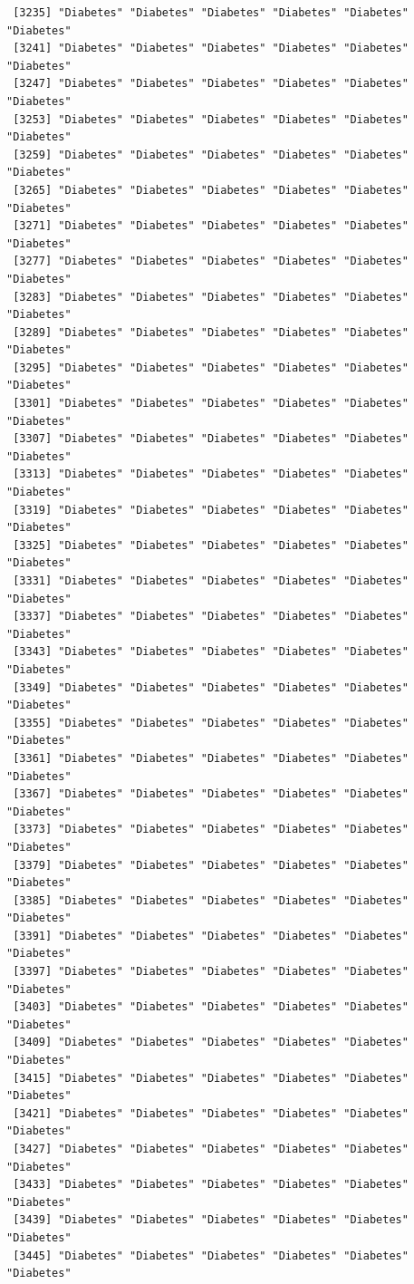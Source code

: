 \documentclass[
  letterpaper,
  DIV=11,
  numbers=noendperiod]{scrartcl}
\begin{document}
\begin{verbatim}
 [3235] "Diabetes" "Diabetes" "Diabetes" "Diabetes" "Diabetes" "Diabetes"
 [3241] "Diabetes" "Diabetes" "Diabetes" "Diabetes" "Diabetes" "Diabetes"
 [3247] "Diabetes" "Diabetes" "Diabetes" "Diabetes" "Diabetes" "Diabetes"
 [3253] "Diabetes" "Diabetes" "Diabetes" "Diabetes" "Diabetes" "Diabetes"
 [3259] "Diabetes" "Diabetes" "Diabetes" "Diabetes" "Diabetes" "Diabetes"
 [3265] "Diabetes" "Diabetes" "Diabetes" "Diabetes" "Diabetes" "Diabetes"
 [3271] "Diabetes" "Diabetes" "Diabetes" "Diabetes" "Diabetes" "Diabetes"
 [3277] "Diabetes" "Diabetes" "Diabetes" "Diabetes" "Diabetes" "Diabetes"
 [3283] "Diabetes" "Diabetes" "Diabetes" "Diabetes" "Diabetes" "Diabetes"
 [3289] "Diabetes" "Diabetes" "Diabetes" "Diabetes" "Diabetes" "Diabetes"
 [3295] "Diabetes" "Diabetes" "Diabetes" "Diabetes" "Diabetes" "Diabetes"
 [3301] "Diabetes" "Diabetes" "Diabetes" "Diabetes" "Diabetes" "Diabetes"
 [3307] "Diabetes" "Diabetes" "Diabetes" "Diabetes" "Diabetes" "Diabetes"
 [3313] "Diabetes" "Diabetes" "Diabetes" "Diabetes" "Diabetes" "Diabetes"
 [3319] "Diabetes" "Diabetes" "Diabetes" "Diabetes" "Diabetes" "Diabetes"
 [3325] "Diabetes" "Diabetes" "Diabetes" "Diabetes" "Diabetes" "Diabetes"
 [3331] "Diabetes" "Diabetes" "Diabetes" "Diabetes" "Diabetes" "Diabetes"
 [3337] "Diabetes" "Diabetes" "Diabetes" "Diabetes" "Diabetes" "Diabetes"
 [3343] "Diabetes" "Diabetes" "Diabetes" "Diabetes" "Diabetes" "Diabetes"
 [3349] "Diabetes" "Diabetes" "Diabetes" "Diabetes" "Diabetes" "Diabetes"
 [3355] "Diabetes" "Diabetes" "Diabetes" "Diabetes" "Diabetes" "Diabetes"
 [3361] "Diabetes" "Diabetes" "Diabetes" "Diabetes" "Diabetes" "Diabetes"
 [3367] "Diabetes" "Diabetes" "Diabetes" "Diabetes" "Diabetes" "Diabetes"
 [3373] "Diabetes" "Diabetes" "Diabetes" "Diabetes" "Diabetes" "Diabetes"
 [3379] "Diabetes" "Diabetes" "Diabetes" "Diabetes" "Diabetes" "Diabetes"
 [3385] "Diabetes" "Diabetes" "Diabetes" "Diabetes" "Diabetes" "Diabetes"
 [3391] "Diabetes" "Diabetes" "Diabetes" "Diabetes" "Diabetes" "Diabetes"
 [3397] "Diabetes" "Diabetes" "Diabetes" "Diabetes" "Diabetes" "Diabetes"
 [3403] "Diabetes" "Diabetes" "Diabetes" "Diabetes" "Diabetes" "Diabetes"
 [3409] "Diabetes" "Diabetes" "Diabetes" "Diabetes" "Diabetes" "Diabetes"
 [3415] "Diabetes" "Diabetes" "Diabetes" "Diabetes" "Diabetes" "Diabetes"
 [3421] "Diabetes" "Diabetes" "Diabetes" "Diabetes" "Diabetes" "Diabetes"
 [3427] "Diabetes" "Diabetes" "Diabetes" "Diabetes" "Diabetes" "Diabetes"
 [3433] "Diabetes" "Diabetes" "Diabetes" "Diabetes" "Diabetes" "Diabetes"
 [3439] "Diabetes" "Diabetes" "Diabetes" "Diabetes" "Diabetes" "Diabetes"
 [3445] "Diabetes" "Diabetes" "Diabetes" "Diabetes" "Diabetes" "Diabetes"

\end{verbatim}
\end{document}
